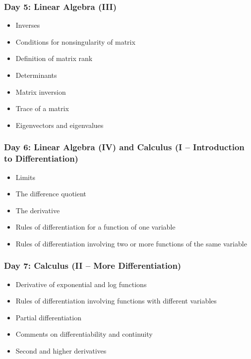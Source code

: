 \documentclass[12pt]{article}
\begin{document}
\subsubsection*{Day 5: Linear Algebra (III)}

\begin{itemize} \itemsep-0.35em
\item Inverses
\item Conditions for nonsingularity of matrix
\item Definition of matrix rank
\item Determinants
\item Matrix inversion
\item Trace of a matrix
\item Eigenvectors and eigenvalues%
\end{itemize}

\subsubsection*{Day 6: Linear Algebra (IV) and Calculus (I -- Introduction to
  Differentiation)}

\begin{itemize} \itemsep-0.35em
\item Limits
\item The difference quotient
\item The derivative
\item Rules of differentiation for a function of one variable
\item Rules of differentiation involving two or more functions of the same
  variable
\end{itemize}

\subsubsection*{Day 7: Calculus (II -- More Differentiation)}

\begin{itemize} \itemsep-0.35em
\item Derivative of exponential and log functions
\item Rules of differentiation involving functions with different
  variables
\item Partial differentiation
\item Comments on differentiability and continuity
\item Second and higher derivatives
\end{itemize}
\end{document}
